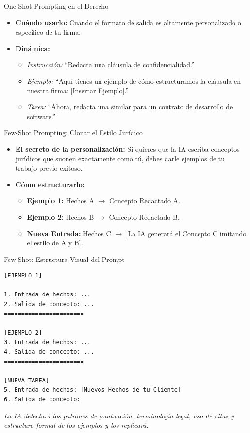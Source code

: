 \documentclass[aspectratio=169]{beamer}
\begin{document}
\begin{frame}[fragile]{One-Shot Prompting en el Derecho}


\begin{itemize}
  \item \textbf{Cuándo usarlo:} Cuando el formato de salida es altamente personalizado o específico de tu firma.
  \item \textbf{Dinámica:}
  \begin{itemize}
    \item \textit{Instrucción:} ``Redacta una cláusula de confidencialidad.''
    \item \textit{Ejemplo:} ``Aquí tienes un ejemplo de cómo estructuramos la cláusula en nuestra firma: [Insertar Ejemplo].''
    \item \textit{Tarea:} ``Ahora, redacta una similar para un contrato de desarrollo de software.''
  \end{itemize}
\end{itemize}
\end{frame}



\begin{frame}[fragile]{Few-Shot Prompting: Clonar el Estilo Jurídico}


\begin{itemize}
  \item \textbf{El secreto de la personalización:} Si quieres que la IA escriba conceptos jurídicos que suonen exactamente como tú, debes darle ejemplos de tu trabajo previo exitoso.
  \item \textbf{Cómo estructurarlo:}
  \begin{itemize}
    \item \textbf{Ejemplo 1:} Hechos A $\rightarrow$ Concepto Redactado A.
    \item \textbf{Ejemplo 2:} Hechos B $\rightarrow$ Concepto Redactado B.
    \item \textbf{Nueva Entrada:} Hechos C $\rightarrow$ [La IA generará el Concepto C imitando el estilo de A y B].
  \end{itemize}
\end{itemize}
\end{frame}



\begin{frame}[fragile]{Few-Shot: Estructura Visual del Prompt}


\begin{lstlisting}[basicstyle=\ttfamily\scriptsize]
[EJEMPLO 1]

1. Entrada de hechos: ...
2. Salida de concepto: ...
=======================

[EJEMPLO 2]
3. Entrada de hechos: ...
4. Salida de concepto: ...
=======================

[NUEVA TAREA]
5. Entrada de hechos: [Nuevos Hechos de tu Cliente]
6. Salida de concepto:
\end{lstlisting}

\textit{La IA detectará los patrones de puntuación, terminología legal, uso de citas y estructura formal de los ejemplos y los replicará.}

\end{frame}
\end{document}
